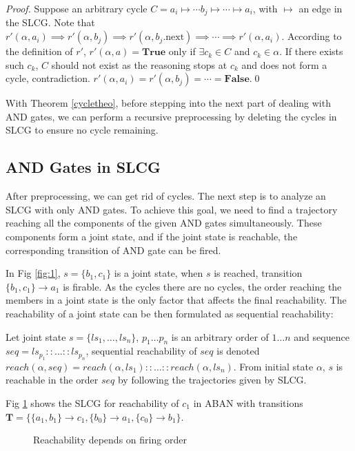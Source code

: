 \documentclass[runningheads]{llncs}
\newcommand{\acm}[3]{\{#1\}\rightarrow#3}
\newcommand{\ac}[3]{$\{#1\}\rightarrow#3$}
\begin{document}
\begin{proof}
Suppose an arbitrary cycle $C=a_i\mapsto \cdots b_j\mapsto\cdots \mapsto a_i$, with $\mapsto$ an edge in the SLCG.
Note that $r'(\alpha,a_i)\implies r'(\alpha,b_j)\implies r'(\alpha,b_j.\text{next})\implies \cdots\implies r'(\alpha,a_i)$.
According to the definition of $r'$, $r'(\alpha,a)=\mathbf{True}$ only if $\exists c_k\in C$ and $c_k\in \alpha$.
If there exists such $c_k$, $C$ should not exist as the reasoning stops at $c_k$ and does not form a cycle, contradiction.
$r'(\alpha,a_i)=r'(\alpha,b_j)=\cdots =\mathbf{False}$.\qed
\end{proof}

With Theorem \ref{cycletheo}, before stepping into the next part of dealing with AND gates, we can perform a recursive preprocessing by deleting the cycles in SLCG to ensure no cycle remaining.

\subsection{AND Gates in SLCG}\label{sectAndGates}
After preprocessing, we can get rid of cycles.
The next step is to analyze an SLCG with only AND gates.
To achieve this goal, we need to find a trajectory reaching all the components of the given AND gates simultaneously.
These components form a joint state, and if the joint state is reachable, the corresponding transition of AND gate can be fired. 

In Fig \ref{fig:1}, $s=\{ b_1,c_1\}$ is a joint state, when $s$ is reached, transition \ac{b_1,c_1}{a_0}{a_1} is firable.
As the cycles there are no cycles, the order reaching the members in a joint state is the only factor that affects the final reachability. 
The reachability of a joint state can be then formulated as sequential reachability:
\begin{definition}
Let joint state $s=\{ls_1,\ldots,ls_n\}$, $p_1\ldots p_n$ is an arbitrary order of $1\ldots n$ and sequence $seq=ls_{p_1}::\ldots::ls_{p_n}$, sequential reachability of $seq$ is denoted $reach(\alpha,seq)=reach(\alpha,ls_1)::\ldots::reach(\alpha,ls_n)$.
From initial state $\alpha$, $s$ is reachable in the order $seq$ by following the trajectories given by SLCG.
\end{definition}

\begin{example}
Fig \ref{fig:5} shows the SLCG for reachability of $c_1$ in ABAN with transitions $\mathbf{T}=\{\acm{a_1,b_1}{c_0}{c_1},\acm{b_0}{a_0}{a_1},\acm{c_0}{b_0}{b_1}\}$.
\end{example}
\begin{figure}[ht]
\centering

\caption{Reachability depends on firing order}
\label{fig:5}
\end{figure}
\end{document}
